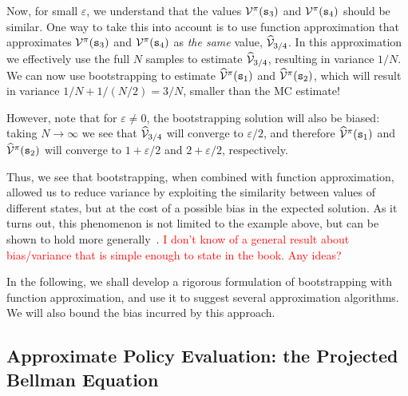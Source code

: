 Now, for small $\varepsilon$, we understand that the values $\mathcal{V}^{\pi}({\tt s}_3)$ and $\mathcal{V}^{\pi}({\tt s}_4)$ should be similar. One way to take this into account is to use function approximation that approximates $\mathcal{V}^{\pi}({\tt s}_3)$ and $\mathcal{V}^{\pi}({\tt s}_4)$ as \textit{the same} value, $\widehat{\mathcal{V}}_{3/4}$. In this approximation we effectively use the full $N$ samples to estimate $\widehat{\mathcal{V}}_{3/4}$, resulting in variance $1/{N}$. We can now use bootstrapping to estimate $\widehat{\mathcal{V}}^{\pi}({\tt s}_1)$ and $\widehat{\mathcal{V}}^{\pi}({\tt s}_2)$, which will result in variance $1 / {N}+ 1 / ({N}/{2}) = 3/{N}$, smaller than the MC estimate!

However, note that for $\varepsilon \neq 0$, the bootstrapping solution will also be biased: taking $N\to \infty$ we see that $\widehat{\mathcal{V}}_{3/4}$ will converge to $\varepsilon/2$, and therefore $\widehat{\mathcal{V}}^{\pi}({\tt s}_1)$ and $\widehat{\mathcal{V}}^{\pi}({\tt s}_2)$ will converge to $1+\varepsilon/2$ and $2+\varepsilon/2$, respectively.

Thus, we see that bootstrapping, when combined with function approximation, allowed us to reduce variance by exploiting the similarity between values of different states, but at the cost of a possible bias in the expected solution. As it turns out, this phenomenon is not limited to the example above, but can be shown to hold more generally~\cite{kearns2000bias}. \textcolor{red}{I don't know of a general result about bias/variance that is simple enough to state in the book. Any ideas?}

In the following, we shall develop a rigorous formulation of bootstrapping with function approximation, and use it to suggest several approximation algorithms. We will also bound the bias incurred by this approach.

\subsection{Approximate Policy Evaluation: the Projected Bellman Equation}


